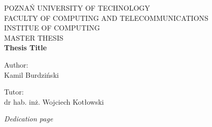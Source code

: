 \documentclass[12pt,a4paper]{article}
\begin{document}
\begin{titlepage}
   \begin{center}
       \vspace*{0.5cm}
POZNAŃ UNIVERSITY OF TECHNOLOGY \\
FACULTY OF COMPUTING AND TELECOMMUNICATIONS \\
       INSTITUE OF COMPUTING \\

       \vspace*{2cm}
       {\Large MASTER THESIS} \\

       \vspace*{1cm}
       \textbf{\Huge Thesis Title}  \normalfont \\

       \vspace{5cm}
       \begin{doublespace}
       Author: \\
       {\Large Kamil Burdziński} \\
       \end{doublespace}
       \vspace{4cm}
       \begin{doublespace}
       Tutor:\\
       {\Large dr hab. inż. Wojciech Kotłowski}
       \end{doublespace}
   \end{center}
\end{titlepage}

\cleardoublepage%


\thispagestyle{empty}
\vspace*{\fill}%
\vspace{17cm}
\begin{flushright}
\textit{Dedication page}
\end{flushright}
\vfill\cleardoublepage%

\tableofcontents
\thispagestyle{empty}

\cleardoublepage %

%





\printbibliography

\clearpage
\listoffigures
\listoftables
\end{document}
